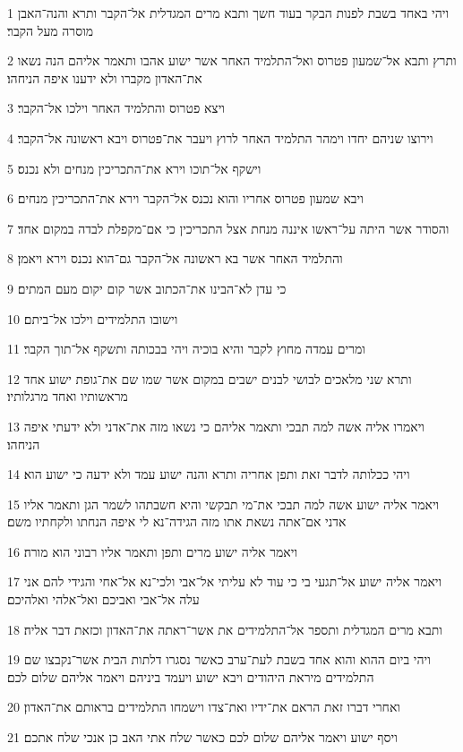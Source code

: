 \par 1 ויהי באחד בשבת לפנות הבקר בעוד חשך ותבא מרים המגדלית אל־הקבר ותרא והנה־האבן מוסרה מעל הקבר׃
\par 2 ותרץ ותבא אל־שמעון פטרוס ואל־התלמיד האחר אשר ישוע אהבו ותאמר אליהם הנה נשאו את־האדון מקברו ולא ידענו איפה הניחהו׃
\par 3 ויצא פטרוס והתלמיד האחר וילכו אל־הקבר׃
\par 4 וירוצו שניהם יחדו וימהר התלמיד האחר לרוץ ויעבר את־פטרוס ויבא ראשונה אל־הקבר׃
\par 5 וישקף אל־תוכו וירא את־התכריכין מנחים ולא נכנס׃
\par 6 ויבא שמעון פטרוס אחריו והוא נכנס אל־הקבר וירא את־התכריכין מנחים׃
\par 7 והסודר אשר היתה על־ראשו איננה מנחת אצל התכריכין כי אם־מקפלת לבדה במקום אחד׃
\par 8 והתלמיד האחר אשר בא ראשונה אל־הקבר גם־הוא נכנס וירא ויאמן׃
\par 9 כי עדן לא־הבינו את־הכתוב אשר קום יקום מעם המתים׃
\par 10 וישובו התלמידים וילכו אל־ביתם׃
\par 11 ומרים עמדה מחוץ לקבר והיא בוכיה ויהי בבכותה ותשקף אל־תוך הקבר׃
\par 12 ותרא שני מלאכים לבושי לבנים ישבים במקום אשר שמו שם את־גופת ישוע אחד מראשותיו ואחד מרגלותיו׃
\par 13 ויאמרו אליה אשה למה תבכי ותאמר אליהם כי נשאו מזה את־אדני ולא ידעתי איפה הניחהו׃
\par 14 ויהי ככלותה לדבר זאת ותפן אחריה ותרא והנה ישוע עמד ולא ידעה כי ישוע הוא׃
\par 15 ויאמר אליה ישוע אשה למה תבכי את־מי תבקשי והיא חשבתהו לשמר הגן ותאמר אליו אדני אם־אתה נשאת אתו מזה הגידה־נא לי איפה הנחתו ולקחתיו משם׃
\par 16 ויאמר אליה ישוע מרים ותפן ותאמר אליו רבוני הוא מורה׃
\par 17 ויאמר אליה ישוע אל־תגעי בי כי עוד לא עליתי אל־אבי ולכי־נא אל־אחי והגידי להם אני עלה אל־אבי ואביכם ואל־אלהי ואלהיכם׃
\par 18 ותבא מרים המגדלית ותספר אל־התלמידים את אשר־ראתה את־האדון וכזאת דבר אליה׃
\par 19 ויהי ביום ההוא והוא אחד בשבת לעת־ערב כאשר נסגרו דלתות הבית אשר־נקבצו שם התלמידים מיראת היהודים ויבא ישוע ויעמד ביניהם ויאמר אליהם שלום לכם׃
\par 20 ואחרי דברו זאת הראם את־ידיו ואת־צדו וישמחו התלמידים בראותם את־האדון׃
\par 21 ויסף ישוע ויאמר אליהם שלום לכם כאשר שלח אתי האב כן אנכי שלח אתכם׃
